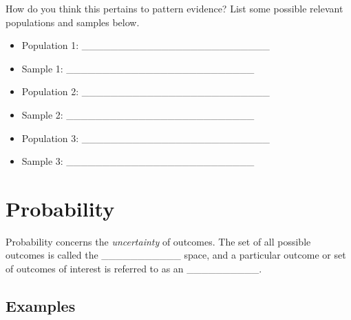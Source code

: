 \documentclass[]{book}
\providecommand{\tightlist}{%
  \setlength{\itemsep}{0pt}\setlength{\parskip}{0pt}}
\theoremstyle{definition}
\theoremstyle{definition}
\theoremstyle{remark}
\begin{document}
How do you think this pertains to pattern evidence? List some possible
relevant populations and samples below.\vspace{.1in}

\begin{itemize}
\tightlist
\item
  Population 1: \_\_\_\_\_\_\_\_\_\_\_\_\_\_\_\_\_\_\_\_\_\_\_\_\_\_
  \vspace{.1in}
\item
  Sample 1: \_\_\_\_\_\_\_\_\_\_\_\_\_\_\_\_\_\_\_\_\_\_\_\_\_\_\\
  \vspace{.1in}
\item
  Population 2: \_\_\_\_\_\_\_\_\_\_\_\_\_\_\_\_\_\_\_\_\_\_\_\_\_\_
  \vspace{.1in}
\item
  Sample 2: \_\_\_\_\_\_\_\_\_\_\_\_\_\_\_\_\_\_\_\_\_\_\_\_\_\_
  \vspace{.1in}
\item
  Population 3: \_\_\_\_\_\_\_\_\_\_\_\_\_\_\_\_\_\_\_\_\_\_\_\_\_\_
  \vspace{.1in}
\item
  Sample 3: \_\_\_\_\_\_\_\_\_\_\_\_\_\_\_\_\_\_\_\_\_\_\_\_\_\_
\end{itemize}

\section{Probability}\label{probability}

Probability concerns the \emph{uncertainty} of outcomes. The set of all
possible outcomes is called the \_\_\_\_\_\_\_\_\_\_\_ space, and a
particular outcome or set of outcomes of interest is referred to as an
\_\_\_\_\_\_\_\_\_\_.

\subsection{Examples}\label{examples}
\end{document}
